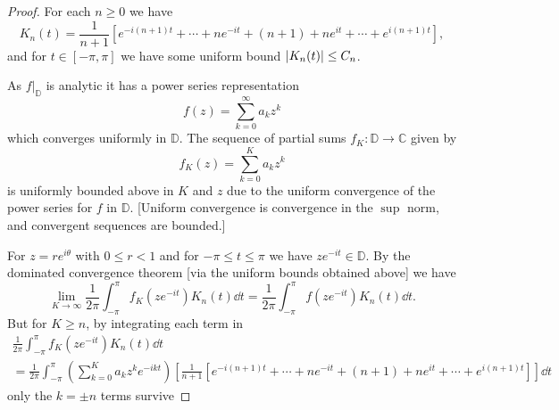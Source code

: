 \documentclass[12pt]{amsart}
\newcommand{\DD}{\mathbb{D}}
\begin{document}
\begin{proof}
\baselineskip=24pt
For each $n\geq 0$ we have \[K_n(t) = \frac{1}{n+1}\left[e^{-i(n+1)t}+ \cdots+ ne^{-it} + (n+1) + ne^{it} +\cdots + e^{i(n+1)t}\right],\] and for $t\in[-\pi,\pi]$ we have some uniform bound $\abs{K_n(t)}\leq C_n$.

As $f|_\DD$ is analytic it has a power series representation \[f(z) = \sum_{k=0}^\infty a_kz^k\] which converges uniformly in $\DD$. The sequence of partial sums $f_K\colon \mathbb{D}\to\mathbb{C}$ given by \[f_K(z) = \sum_{k=0}^Ka_kz^k\] is uniformly bounded above in $K$ and $z$ due to the uniform convergence of the power series for $f$ in $\DD$. [Uniform convergence is convergence in the $\sup$ norm, and convergent sequences are bounded.] 

For $z = re^{i\theta}$ with $0\leq r < 1$ and for $-\pi\leq t\leq \pi$ we have $ze^{-it}\in \DD$. By the dominated convergence theorem [via the uniform bounds obtained above] we have \[\lim_{K\to\infty}\frac{1}{2\pi}\int_{-\pi}^{\pi}f_K(ze^{-it})K_n(t)\dd{t} = \frac{1}{2\pi}\int_{-\pi}^{\pi}f(ze^{-it})K_n(t)\dd{t}.\] But for $K\geq n$, by integrating each term in \begin{multline*}
\frac{1}{2\pi}\int_{-\pi}^{\pi}f_K(ze^{-it})K_n(t)\dd{t} \\ = \frac{1}{2\pi}\int_{-\pi}^{\pi}\left(\sum_{k=0}^Ka_kz^ke^{-ikt}\right)\left[\frac{1}{n+1}\left[e^{-i(n+1)t}+ \cdots+ ne^{-it} + (n+1) + ne^{it} +\cdots + e^{i(n+1)t}\right]\right]\dd{t}\end{multline*} only the $k = \pm n$ terms survive
\end{proof}
\end{document}

